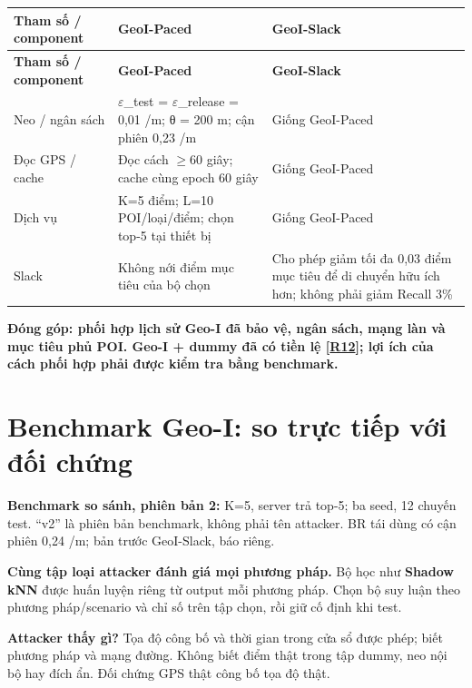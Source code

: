 \documentclass[10pt,a4paper]{article}
\newcommand{\key}[1]{\par\smallskip\noindent\colorbox{pale}{\parbox{\dimexpr\linewidth-2\fboxsep}{\textbf{#1}}}\par\smallskip}
\begin{document}
\begingroup\small
\begin{longtable}{@{}P{3.938cm}P{6.350cm}P{6.350cm}@{}}
\toprule
\textbf{Tham số / component} & \textbf{GeoI-Paced} & \textbf{GeoI-Slack}\\\midrule
\endfirsthead
\toprule
\textbf{Tham số / component} & \textbf{GeoI-Paced} & \textbf{GeoI-Slack}\\\midrule
\endhead
\bottomrule\endfoot
Neo / ngân sách & $\varepsilon$\_\allowbreak{}test = $\varepsilon$\_\allowbreak{}release = 0,01 /m; θ = 200 m; cận phiên 0,23 /m & Giống GeoI-Paced\\
\addlinespace[3pt]
Đọc GPS / cache & Đọc cách $\ge$60 giây; cache cùng epoch 60 giây & Giống GeoI-Paced\\
\addlinespace[3pt]
Dịch vụ & K=5 điểm; L=10 POI/loại/điểm; chọn top-5 tại thiết bị & Giống GeoI-Paced\\
\addlinespace[3pt]
Slack & Không nới điểm mục tiêu của bộ chọn & Cho phép giảm tối đa 0,03 điểm mục tiêu để di chuyển hữu ích hơn; không phải giảm Recall 3\%\\
\end{longtable}
\endgroup
\key{Đóng góp: phối hợp lịch sử Geo-I đã bảo vệ, ngân sách, mạng làn và mục tiêu phủ POI. Geo-I + dummy đã có tiền lệ [\hyperlink{ref-R12}{R12}]; lợi ích của cách phối hợp phải được kiểm tra bằng benchmark.}


\clearpage
\section{Benchmark Geo-I: so trực tiếp với đối chứng}\label{sec:3}
\textbf{Benchmark so sánh, phiên bản 2:} K=5, server trả top-5; ba seed, 12 chuyến test. “v2” là phiên bản benchmark, không phải tên attacker. BR tái dùng có cận phiên 0,24 /m; bản trước GeoI-Slack, báo riêng.

\textbf{Cùng tập loại attacker đánh giá mọi phương pháp.} Bộ học như \textbf{Shadow kNN} được huấn luyện riêng từ output mỗi phương pháp. Chọn bộ suy luận theo phương pháp/scenario và chỉ số trên tập chọn, rồi giữ cố định khi test.

\textbf{Attacker thấy gì?} Tọa độ công bố và thời gian trong cửa sổ được phép; biết phương pháp và mạng đường. Không biết điểm thật trong tập dummy, neo nội bộ hay đích ẩn. Đối chứng GPS thật công bố tọa độ thật.
\end{document}
